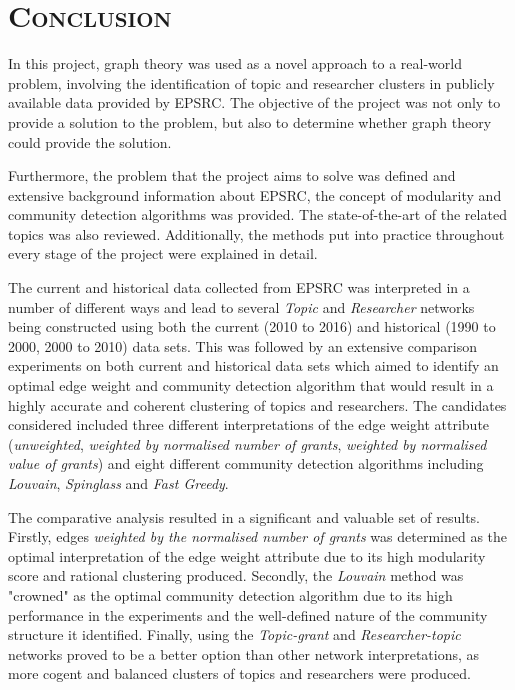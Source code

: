 \chapter{\textsc{Conclusion}}
\label{chapter:conclusion}

In this project, graph theory was used as a novel approach to a real-world problem, involving the identification of topic and researcher clusters in publicly available data provided by EPSRC. The objective of the project was not only to provide a solution to the problem, but also to determine whether graph theory could provide the solution.

Furthermore, the problem that the project aims to solve was defined and extensive background information about EPSRC, the concept of modularity and community detection algorithms was provided. The state-of-the-art of the related topics was also reviewed. Additionally, the methods put into practice throughout every stage of the project were explained in detail.

The current and historical data collected from EPSRC was interpreted in a number of different ways and lead to several \textit{Topic} and \textit{Researcher} networks being constructed using both the current (2010 to 2016) and historical (1990 to 2000, 2000 to 2010) data sets. This was followed by an extensive comparison experiments on both current and historical data sets which aimed to identify an optimal edge weight and community detection algorithm that would result in a highly accurate and coherent clustering of topics and researchers. The candidates considered included three different interpretations of the edge weight attribute (\textit{unweighted}, \textit{weighted by normalised number of grants}, \textit{weighted by normalised value of grants}) and eight different community detection algorithms including \textit{Louvain}, \textit{Spinglass} and \textit{Fast Greedy}.

The comparative analysis resulted in a significant and valuable set of results. Firstly, edges \textit{weighted by the normalised number of grants} was determined as the optimal interpretation of the edge weight attribute due to its high modularity score and rational clustering produced. Secondly, the \textit{Louvain} method was "crowned" as the optimal community detection algorithm due to its high performance in the experiments and the well-defined nature of the community structure it identified. Finally, using the \textit{Topic-grant} and \textit{Researcher-topic} networks proved to be a better option than other network interpretations, as more cogent and balanced clusters of topics and researchers were produced.

